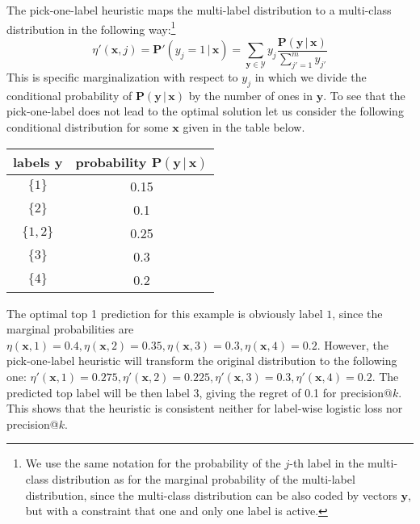 \documentclass{article}
\renewcommand{\vec}[1]{\boldsymbol{#1}}
\newcommand{\bx}{\vec{x}}
\newcommand{\by}{\vec{y}}
\newcommand{\calY}{\mathcal{Y}}
\newcommand{\prob}{\mathbf{P}}
\newcommand{\given}{\, | \,}
\begin{document}
{%
The pick-one-label heuristic maps the multi-label distribution to a multi-class distribution in the following way:\footnote{We use the same notation for the probability of the $j$-th label in the multi-class distribution as for the marginal probability of the multi-label distribution, since the multi-class distribution can be also coded by vectors $\by$, but with a constraint that one and only one label is active.}
\begin{equation}
\eta'(\bx, j) = \prob'(y_j = 1 \given \bx) = \sum_{\by \in \calY} y_j \frac{\prob(\by \given \bx)}{\sum_{j'=1}^m y_{j'}}
\label{eq:heuristic}
\end{equation}
This is specific marginalization with respect to $y_j$ in which we divide the conditional probability of  $\prob(\by \given \bx)$ by the number of ones in $\by$. To see that the pick-one-label does not lead to the optimal solution let us consider the following conditional distribution for some $\bx$ given in the table below.
\begin{center}
\begin{tabular}{c c}
\toprule
labels $\by$ & probability $\prob(\by \given \bx)$ \\
\midrule
$\{1\}$ & 0.15 \\
$\{2\}$ & 0.1 \\
$\{1, 2\}$ & 0.25 \\
$\{3\}$ & 0.3 \\
$\{4\}$ & 0.2 \\
\bottomrule
\end{tabular}
\end{center}
The optimal top 1 prediction for this example is obviously label $1$, since the marginal probabilities are $\eta(\bx,1) = 0.4, \eta(\bx,2) = 0.35,  \eta(\bx,3) = 0.3, \eta(\bx,4) =0.2$. However, the pick-one-label heuristic will transform the original distribution to the following one: $\eta'(\bx,1) = 0.275, \eta'(\bx,2) = 0.225,  \eta'(\bx,3) = 0.3, \eta'(\bx,4) =0.2$. The predicted top label will be then label $3$, giving the regret of 0.1 for precision@$k$. This shows that the heuristic is consistent neither for label-wise logistic loss nor precision@$k$. 


}
\end{document}
